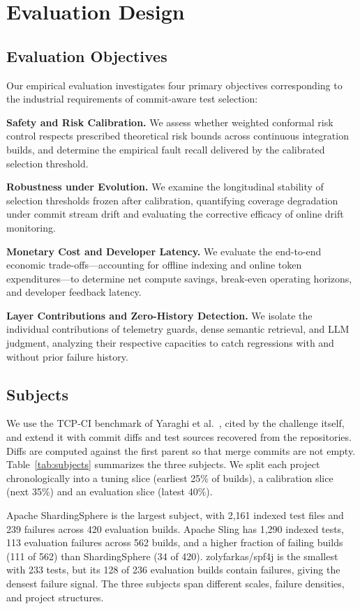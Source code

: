 \section{Evaluation Design}
\label{sec:evaluation}

\subsection{Evaluation Objectives}

Our empirical evaluation investigates four primary objectives corresponding to the industrial requirements of commit-aware test selection:

\textbf{Safety and Risk Calibration.} We assess whether weighted conformal risk control respects prescribed theoretical risk bounds across continuous integration builds, and determine the empirical fault recall delivered by the calibrated selection threshold.

\textbf{Robustness under Evolution.} We examine the longitudinal stability of selection thresholds frozen after calibration, quantifying coverage degradation under commit stream drift and evaluating the corrective efficacy of online drift monitoring.

\textbf{Monetary Cost and Developer Latency.} We evaluate the end-to-end economic trade-offs—accounting for offline indexing and online token expenditures—to determine net compute savings, break-even operating horizons, and developer feedback latency.

\textbf{Layer Contributions and Zero-History Detection.} We isolate the individual contributions of telemetry guards, dense semantic retrieval, and LLM judgment, analyzing their respective capacities to catch regressions with and without prior failure history.

\subsection{Subjects}

We use the TCP-CI benchmark of Yaraghi et al.~\cite{yaraghi2023tcpci}, cited by the challenge itself, and extend it with commit diffs and test sources recovered from the repositories. Diffs are computed against the first parent so that merge commits are not empty. Table~\ref{tab:subjects} summarizes the three subjects. We split each project chronologically into a tuning slice (earliest 25\% of builds), a calibration slice (next 35\%) and an evaluation slice (latest 40\%).

Apache ShardingSphere is the largest subject, with 2,161 indexed test files and 239 failures across 420 evaluation builds. Apache Sling has 1,290 indexed tests, 113 evaluation failures across 562 builds, and a higher fraction of failing builds (111 of 562) than ShardingSphere (34 of 420). zolyfarkas/spf4j is the smallest with 233 tests, but its 128 of 236 evaluation builds contain failures, giving the densest failure signal. The three subjects span different scales, failure densities, and project structures.

